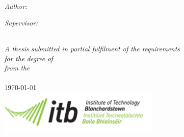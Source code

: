 \documentclass[11pt, a4paper, oneside]{Thesis} %
\begin{document}
\begin{titlepage}
\begin{center}

\textsc{\LARGE \univname}\\[1.5cm] %

\HRule \\[0.4cm] %
{\huge \bfseries \ttitle}\\[0.4cm] %
\HRule \\[1.5cm] %
 
\begin{minipage}{0.4\textwidth}
\begin{flushleft} \large
\emph{Author:}\\
{\authornames} %
\end{flushleft}
\end{minipage}
\begin{minipage}{0.4\textwidth}
\begin{flushright} \large
\emph{Supervisor:} \\
{\supname} %
\end{flushright}
\end{minipage}\\[3cm]
 
\large \textit{A thesis submitted in partial fulfilment of the requirements\\ for the degree of \degreename}\\[0.3cm] %
\textit{from the}\\[0.4cm]
\deptname\\[2cm] %


{\large \today}\\[4cm] %
\includegraphics[width=8cm]{./Figures/itb_logo}  %

\renewcommand{\today}{\ifnum\number\day<10 0\fi \number\day \space%
\ifcase \month \or January\or February\or March\or April\or May%
\or June\or July\or August\or September\or October\or November\or December\fi,%
\number \year} 

\vfill
\end{center}

\end{titlepage}
\end{document}
